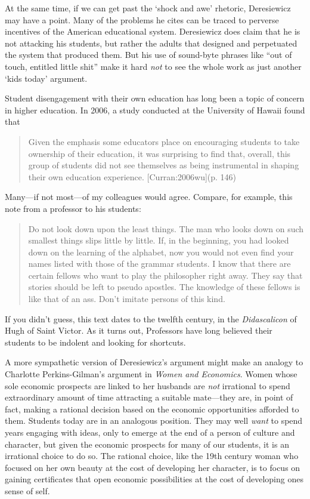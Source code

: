 At the same time, if we can get past the `shock and awe' rhetoric, Deresiewicz may have a point. Many of the problems he cites can be traced to perverse incentives of the American educational system. Deresiewicz does claim that he is not attacking his students, but rather the adults that designed and perpetuated the system that produced them. But his use of sound-byte phrases like ``out of touch, entitled little shit'' make it hard \emph{not} to see the whole work as just another `kids today' argument.

Student disengagement with their own education has long been a topic of concern in higher education. In 2006, a study conducted at the University of Hawaii found that

\begin{quote}

Given the emphasis some educators place on encouraging students to take ownership of their education, it was surprising to find that, overall, this group of students did not see themselves as being instrumental in shaping their own education experience. [Curran:2006wu](p. 146) 
\end{quote}

Many---if not most---of my colleagues would agree. Compare, for example, this note from a professor to his students: 

\begin{quote}

Do not look down upon the least things. The man who looks down on such smallest things slips little by little. If, in the beginning, you had looked down on the learning of the alphabet, now you would not even find your names listed with those of the grammar students. I know that there are certain fellows who want to play the philosopher right away. They say that stories should be left to pseudo apostles. The knowledge of these fellows is like that of an ass. Don't imitate persons of this kind. 
\end{quote}

If you didn't guess, this text dates to the twelfth century, in the \emph{Didascalicon} of Hugh of Saint Victor. As it turns out, Professors have long believed their students to be indolent and looking for shortcuts.

A more sympathetic version of Deresiewicz's argument might make an analogy to Charlotte Perkins-Gilman's argument in \emph{Women and Economics}. Women whose sole economic prospects are linked to her husbands are \emph{not} irrational to spend extraordinary amount of time attracting a suitable mate---they are, in point of fact, making a rational decision based on the economic opportunities afforded to them. Students today are in an analogous position. They may well \emph{want} to spend years engaging with ideas, only to emerge at the end of a person of culture and character, but given the economic prospects for many of our students, it is an irrational choice to do so. The rational choice, like the 19th century woman who focused on her own beauty at the cost of developing her character, is to focus on gaining certificates that open economic possibilities at the cost of developing ones sense of self. 

